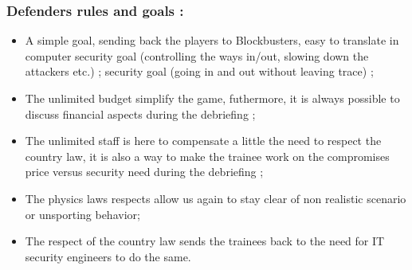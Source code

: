 \documentclass[11pt]{article} %
\begin{document}
\subsubsection{Defenders rules and goals : }
\begin{itemize}
\item A simple goal, sending back the players to Blockbusters, easy to translate in computer 
security goal (controlling the ways in/out, slowing down the attackers etc.) ;
security goal (going in and out without leaving trace) ;
\item The unlimited budget simplify the game, futhermore, it is always possible to discuss 
financial aspects during the debriefing ;
\item The unlimited staff is here to compensate a little the need to respect the country law, 
it is also a way to make the trainee work on the compromises price versus security need 
during the debriefing ;
\item The physics laws respects allow us again to stay clear of non realistic scenario or 
unsporting behavior;
\item The respect of the country law sends the trainees back to the need for IT security 
engineers to do the same.
\end{itemize}

\end{document}
